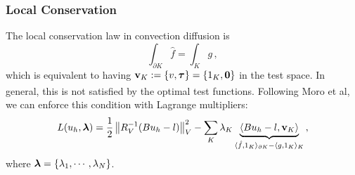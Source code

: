 \documentclass{beamer}
\begin{document}
\begin{frame}
\frametitle{Local Conservation}
The local conservation law in convection diffusion is
\[
\int_{\partial K}\hat f=\int_K g\,,
\]
which is equivalent to having $\mathbf{v}_K:=\{v,\boldsymbol\tau\}=\{1_K,\boldsymbol0\}$ in the test space.
In general, this is not satisfied by the optimal test functions.
Following Moro et al\textsuperscript{\cite{MoroNguyenPeraire11}}, we
can enforce this condition with Lagrange multipliers:
\begin{align*}
L(u_h,\boldsymbol\lambda) = \frac{1}{2}\left\| R_V^{-1}(Bu_h-l) \right\|_V^2
-\sum_K\lambda_K\underbrace{\langle Bu_h-l,\mathbf{v}_K\rangle}_
{\langle\hat f, 1_K\rangle_{\partial K}-\langle g,1_K\rangle_K}\,,
\end{align*}
where $\boldsymbol\lambda=\{\lambda_1,\cdots,\lambda_N\}$.
\end{frame}

\end{document}
